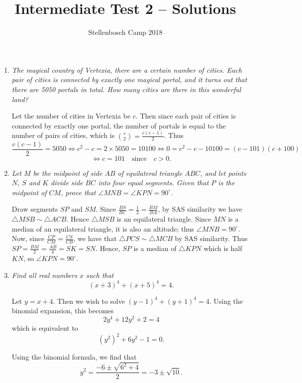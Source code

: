 \documentclass{article}
\title{Intermediate Test 2 -- Solutions}
\author{Stellenbosch Camp 2018}
\date{\vspace{-12pt}}
\begin{document}
\maketitle

\begin{enumerate}

\item %
\textit{The magical country of Vertexia, there are a certain number of cities. Each pair of cities is connected by exactly one magical portal, and it turns out that there are 5050 portals in total. How many cities are there in this wonderful land?}

Let the number of cities in Vertexia be $c$. Then since each pair of cities is connected by exactly one portal, the number of portals is equal to the number of pairs of cities, which is $\binom{c}{2} = \frac{c(c-1)}{2}$. Thus \[ \frac{c(c-1)}{2} = 5050 \iff c^2 -c = 2\times5050 = 10100 \iff 0 = c^2 -c -10100 = (c-101)(c+100) \]
\[ \iff c = 101 \quad \mathrm{since} \quad c > 0. \]


\vspace{12pt}
\item 
\textit{Let $M$ be the midpoint of side $AB$ of equilateral triangle $ABC$, and let points $N$, $S$ and $K$ divide side $BC$ into four equal segments. Given that $P$ is the midpoint of $CM$, prove that $\angle MNB = \angle KPN = 90^\circ$.}

Draw segments $SP$ and $SM$. Since $\frac{BS}{BC} = \frac{1}{2} = \frac{BM}{BA}$, by SAS similarity we have $\triangle MSB \sim \triangle ACB$. Hence $\triangle MSB$ is an equilateral triangle. Since $MN$ is a median of an equilateral triangle, it is also an altitude; thus $\angle MNB = 90^\circ$. Now, since $\frac{CP}{CM} = \frac{CS}{CB}$, we have that $\triangle PCS \sim \triangle MCB$ by SAS similarity. Thus $SP = \frac{BM}{2} = \frac{AB}{4} = SK = SN$. Hence, $SP$ is a median of $\triangle KPN$ which is half $KN$, so $\angle KPN = 90^\circ$.


\vspace{12pt}
\item %
\textit{Find all real numbers $x$ such that \[ (x+3)^4 + (x+5)^4 = 4. \]}

Let $y = x + 4$. Then we wish to solve ${(y - 1)}^4 + {(y + 1)}^4 = 4$. Using the binomial expansion, this becomes
\[
	2y^4 + 12y^2 + 2 = 4
\]
which is equivalent to
\[
	{(y^2)}^2 + 6y^2 - 1 = 0. 
\]

Using the binomial formula, we find that
\[
	y^2 = \frac{-6 \pm \sqrt{6^2 + 4}}{2} = -3 \pm \sqrt{10}.
\]


\end{enumerate}
\end{document}
